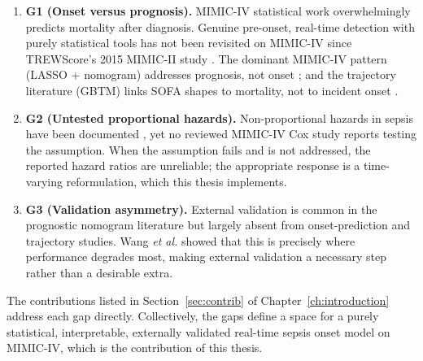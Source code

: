 \begin{enumerate}
  \item \textbf{G1 (Onset versus prognosis).} MIMIC-IV statistical work
  overwhelmingly predicts mortality after diagnosis. Genuine pre-onset,
  real-time detection with purely statistical tools has not been revisited on
  MIMIC-IV since TREWScore's 2015 MIMIC-II study \cite{henry2015trewscore}.
  The dominant MIMIC-IV pattern (LASSO + nomogram) addresses prognosis, not
  onset \cite{yuan2023nomogram}; and the trajectory literature (GBTM) links
  SOFA shapes to mortality, not to incident onset \cite{yang2022gbtm}.

  \item \textbf{G2 (Untested proportional hazards).} Non-proportional hazards
  in sepsis have been documented \cite{kasal2004cox}, yet no reviewed MIMIC-IV
  Cox study reports testing the assumption. When the assumption fails and is
  not addressed, the reported hazard ratios are unreliable; the appropriate
  response is a time-varying reformulation, which this thesis implements.

  \item \textbf{G3 (Validation asymmetry).} External validation is common in
  the prognostic nomogram literature \cite{yuan2023nomogram} but largely absent
  from onset-prediction and trajectory studies. Wang \emph{et al.}
  \cite{wang2025srpm} showed that this is precisely where performance degrades
  most, making external validation a necessary step rather than a desirable
  extra.
\end{enumerate}

The contributions listed in Section~\ref{sec:contrib} of
Chapter~\ref{ch:introduction} address each gap directly. Collectively, the
gaps define a space for a purely statistical, interpretable, externally validated
real-time sepsis onset model on MIMIC-IV, which is the contribution of this
thesis.
